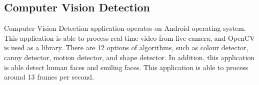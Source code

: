         \subsection{Computer Vision Detection}
            Computer Vision Detection application operates on Android operating system.
            This application is able to process real-time video from live camera,
            and OpenCV is used as a library.
            There are 12 options of algorithms, such as colour detector, canny detector, motion detector, and shape detector.
            In addition, this application is able detect human faces and smiling faces.
            This application is able to process around 13 frames per second.
